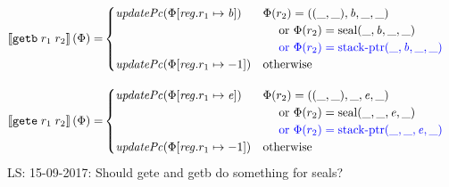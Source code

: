 \documentclass[a3paper]{article}
\newcommand\lau[1]{{\color{purple} \sf \footnotesize {LS: #1}}\\}
\newcommand{\sem}[1]{\left\llbracket #1 \right\rrbracket}
\newcommand{\tor}{\text{ or }}
\newcommand{\totherwise}{\text{otherwise }}
\newcommand{\sourcecolor}{\color{blue}}
\newcommand{\src}[1]{{\sourcecolor #1}}
\newcommand{\targetcolor}[1]{\color{black}}
\newcommand{\trg}[1]{{\targetcolor{} #1}}
\newcommand{\zinstr}[1]{\texttt{#1}}
\newcommand{\twoinstr}[3]{
  \ifthenelse{\equal{#2#3}{}}
  {\zinstr{#1}}
  {\zinstr{#1} \; #2 \; #3}
}
\newcommand{\tgetb}[2]{\twoinstr{\trg{getb}}{#1}{#2}}
\newcommand{\tgete}[2]{\twoinstr{\trg{gete}}{#1}{#2}}
\newcommand{\update}[2]{[#1 \mapsto #2]}
\newcommand{\updReg}[2]{\update{\reg.#1}{#2}}
\newcommand{\shareddom}[1]{\mathrm{#1}}
\newcommand{\stkptr}[1]{\mathrm{stack\text{-}ptr}(#1)}
\newcommand{\seal}[1]{\shareddom{seal}(#1)}
\newcommand{\var}[1]{\mathit{#1}}
\newcommand{\reg}{\var{reg}}
\newcommand{\baddr}{\var{b}}
\newcommand{\eaddr}{\var{e}}
\newcommand{\plainfun}[2]{
  \ifthenelse{\equal{#2}{}}
  {\mathit{#1}}
  {\mathit{#1}(#2)}
}
\newcommand{\updPcAddr}[1]{\plainfun{updatePc}{#1}}
\begin{document}
\begin{align*}
  \sem{\tgetb{r_1}{r_2}}(\Phi) = & 
                                   \begin{cases}
                                     \updPcAddr{\Phi\updReg{r_1}{\baddr}} & 
                                     \arraycolsep=0pt
                                     \begin{array}[t]{l}
                                       \Phi(r_2) = ((\_,\_),\baddr,\_,\_) \\
                                       \quad \tor \Phi(r_2) = \seal{\_,\baddr,\_,\_} \\
                                       \quad \src{\tor \Phi(r_2) = \stkptr{\_,\baddr,\_,\_} } \\
                                     \end{array} \\
                                     \updPcAddr{\Phi\updReg{r_1}{-1}} & \totherwise
                                   \end{cases}
\end{align*}

\begin{align*}
  \sem{\tgete{r_1}{r_2}}(\Phi) = & 
                                   \begin{cases}
                                     \updPcAddr{\Phi\updReg{r_1}{\eaddr}} & 
                                     \arraycolsep=0pt
                                     \begin{array}[t]{l}
                                       \Phi(r_2) = ((\_,\_),\_,\eaddr,\_) \\
                                       \quad \tor \Phi(r_2) = \seal{\_,\_,\eaddr,\_} \\
                                       \quad \src{\tor \Phi(r_2) = \stkptr{\_,\_,\eaddr,\_} } \\
                                     \end{array} \\
                                     \updPcAddr{\Phi\updReg{r_1}{-1}} & \totherwise
                                   \end{cases}
\end{align*}
\lau{15-09-2017: Should gete and getb do something for seals?}
\end{document}
